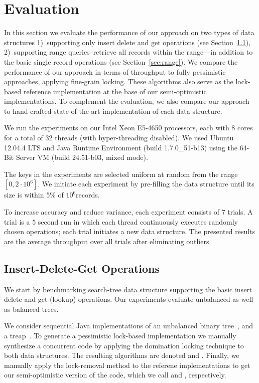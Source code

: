 \section{Evaluation}
\label{sec:eval}

In this section we evaluate the performance of our approach on two types of data
structures 1)~supporting only insert delete and get operations (see
Section~\ref{sec:readwrite}), 2)~supporting range queries--retrieve all records
within the range---in addition to the basic single record operations (see
Section~\ref{sec:range}). We compare the performance of our approach in terms of
throughput to fully pessimistic approaches,  applying fine-grain locking. These
algorithms also serve as the lock-based reference implementation at the base of
our semi-optimistic implementations. To complement the evaluation, we also
compare our approach to hand-crafted state-of-the-art implementation of each
data structure.         

We run the experiments on our Intel Xeon E5-4650 processors, 
each with 8 cores for a total of 32 threads 
(with hyper-threading disabled). 
We used Ubuntu 12.04.4 LTS and Java Runtime Environment (build
1.7.0\_51-b13) using the 64-Bit Server VM (build 24.51-b03, mixed mode).


The keys in the experiments are selected uniform at random from the range
$[0,2\cdot10^6]$. We initiate each experiment by pre-filling the data structure until its size is within 5\% of $10^6$records.   

To increase accuracy and reduce variance, each experiment consists of $7$ trials. A trial is a $5$ second run in which each thread continuously executes randomly chosen operations; each trial initiates a new data structure. The presented results are the average throughput over all trials after eliminating outliers.

\subsection{Insert-Delete-Get Operations}
\label{sec:readwrite} 

We start by benchmarking search-tree data structure supporting the basic insert delete and get (lookup) operations. Our experiments evaluate unbalanced as well as balanced trees.

We consider sequential Java implementations of an unbalanced binary
tree~\cite{binary tree source code}, and a treap~\cite{treap source code}. To
generate a pessimistic lock-based implementation we manually synthesize a concurrent code by applying the domination locking technique to both data structures. The resulting algorithms are denoted \domTree and \domTreap. Finally, we manually apply the lock-removal method to the referene implementations to get our semi-optimistic version of the code, which we call \autoTree and \autoTreap, respectively.

